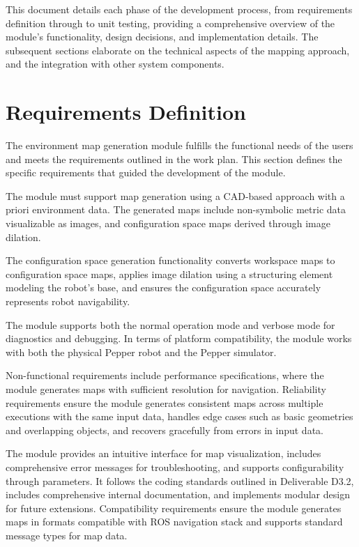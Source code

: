 \documentclass{CSSRforAfrica}
\begin{document}
\noindent This document details each phase of the development process, from requirements definition through to unit testing, providing a comprehensive overview of the module's functionality, design decisions, and implementation details. The subsequent sections elaborate on the technical aspects of the mapping approach, and the integration with other system components.


\newpage
\section{Requirements Definition}
The environment map generation module fulfills the functional needs of the users and meets the requirements outlined in the work plan. This section defines the specific requirements that guided the development of the module.

\noindent The module must support map generation using a CAD-based approach with a priori environment data. The generated maps include non-symbolic metric data visualizable as images, and configuration space maps derived through image dilation.

\noindent The configuration space generation functionality converts workspace maps to configuration space maps, applies image dilation using a structuring element modeling the robot's base, and ensures the configuration space accurately represents robot navigability.

\noindent The module supports both the normal operation mode and verbose mode for diagnostics and debugging. In terms of platform compatibility, the module works with both the physical Pepper robot and the Pepper simulator.

\noindent Non-functional requirements include performance specifications, where the module generates maps with sufficient resolution for navigation. Reliability requirements ensure the module generates consistent maps across multiple executions with the same input data, handles edge cases such as basic geometries and overlapping objects, and recovers gracefully from errors in input data. \newline

\noindent The module provides an intuitive interface for map visualization, includes comprehensive error messages for troubleshooting, and supports configurability through parameters. It follows the coding standards outlined in Deliverable D3.2, includes comprehensive internal documentation, and implements modular design for future extensions. Compatibility requirements ensure the module generates maps in formats compatible with ROS navigation stack and supports standard message types for map data.
\end{document}
